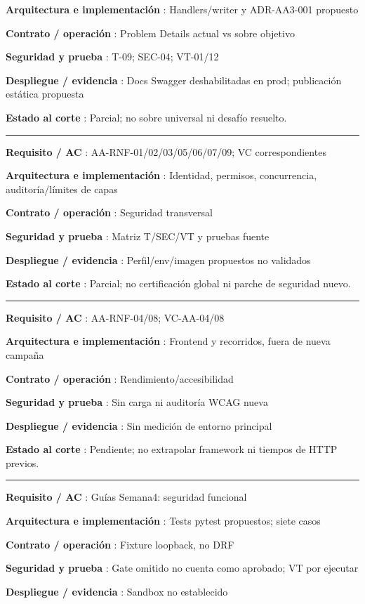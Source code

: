 \documentclass[12pt,a4paper]{report}
\begin{document}
\textbf{Arquitectura e implementación }: Handlers/writer y ADR-AA3-001
propuesto

\textbf{Contrato / operación }: Problem Details actual vs sobre objetivo

\textbf{Seguridad y prueba }: T-09; SEC-04; VT-01/12

\textbf{Despliegue / evidencia }: Docs Swagger deshabilitadas en prod;
publicación estática propuesta

\textbf{Estado al corte }: Parcial; no sobre universal ni desafío
resuelto.

\medskip\hrule\medskip

\textbf{Requisito / AC }: AA-RNF-01/02/03/05/06/07/09; VC
correspondientes

\textbf{Arquitectura e implementación }: Identidad, permisos,
concurrencia, auditoría/límites de capas

\textbf{Contrato / operación }: Seguridad transversal

\textbf{Seguridad y prueba }: Matriz T/SEC/VT y pruebas fuente

\textbf{Despliegue / evidencia }: Perfil/env/imagen propuestos no
validados

\textbf{Estado al corte }: Parcial; no certificación global ni parche de
seguridad nuevo.

\medskip\hrule\medskip

\textbf{Requisito / AC }: AA-RNF-04/08; VC-AA-04/08

\textbf{Arquitectura e implementación }: Frontend y recorridos, fuera de
nueva campaña

\textbf{Contrato / operación }: Rendimiento/accesibilidad

\textbf{Seguridad y prueba }: Sin carga ni auditoría WCAG nueva

\textbf{Despliegue / evidencia }: Sin medición de entorno principal

\textbf{Estado al corte }: Pendiente; no extrapolar framework ni tiempos
de HTTP previos.

\medskip\hrule\medskip

\textbf{Requisito / AC }: Guías Semana4: seguridad funcional

\textbf{Arquitectura e implementación }: Tests pytest propuestos; siete
casos

\textbf{Contrato / operación }: Fixture loopback, no DRF

\textbf{Seguridad y prueba }: Gate omitido no cuenta como aprobado; VT
por ejecutar

\textbf{Despliegue / evidencia }: Sandbox no establecido
\end{document}
